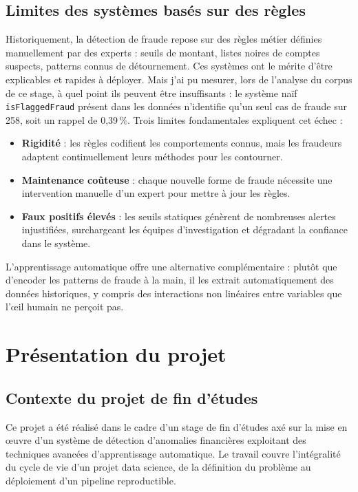 \documentclass[12pt,a4paper,twoside]{report}
\begin{document}
\subsection{Limites des systèmes basés sur des règles}

Historiquement, la détection de fraude repose sur des règles métier définies manuellement par des experts : seuils de montant, listes noires de comptes suspects, patterns connus de détournement. Ces systèmes ont le mérite d'être explicables et rapides à déployer. Mais j'ai pu mesurer, lors de l'analyse du corpus de ce stage, à quel point ils peuvent être insuffisants : le système naïf \texttt{isFlaggedFraud} présent dans les données n'identifie qu'un seul cas de fraude sur 258, soit un rappel de 0,39\,\%. Trois limites fondamentales expliquent cet échec :

\begin{itemize}
  \item \textbf{Rigidité} : les règles codifient les comportements connus, mais les fraudeurs adaptent continuellement leurs méthodes pour les contourner.
  \item \textbf{Maintenance coûteuse} : chaque nouvelle forme de fraude nécessite une intervention manuelle d'un expert pour mettre à jour les règles.
  \item \textbf{Faux positifs élevés} : les seuils statiques génèrent de nombreuses alertes injustifiées, surchargeant les équipes d'investigation et dégradant la confiance dans le système.
\end{itemize}

L'apprentissage automatique offre une alternative complémentaire : plutôt que d'encoder les patterns de fraude à la main, il les extrait automatiquement des données historiques, y compris des interactions non linéaires entre variables que l'œil humain ne perçoit pas.

\section{Présentation du projet}

\subsection{Contexte du projet de fin d'études}

Ce projet a été réalisé dans le cadre d'un stage de fin d'études axé sur la mise en œuvre d'un système de détection d'anomalies financières exploitant des techniques avancées d'apprentissage automatique. Le travail couvre l'intégralité du cycle de vie d'un projet data science, de la définition du problème au déploiement d'un pipeline reproductible.
\end{document}
